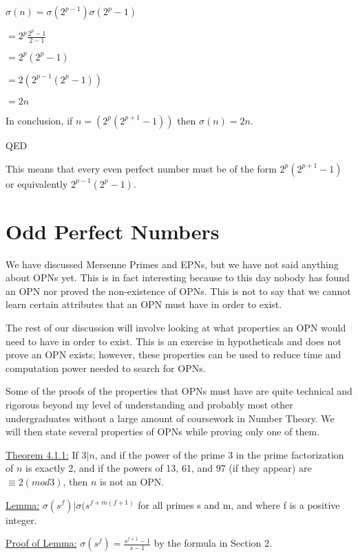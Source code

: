 \documentclass[12pt]{amsart}
\begin{document}
\begin{center}
$\sigma(n) = \sigma(2^{p-1}) \sigma(2^p -1)$

$ = 2^p\frac{2^p - 1}{2-1}$

$ = 2^p(2^p - 1)$

$ = 2(2^{p-1}(2^p - 1))$

$ = 2n$

\end{center}

In conclusion, if $n = (2^p(2^{p+1}-1))$ then $\sigma(n) = 2n$. 

QED

This means that every even perfect number must be of the form $2^p(2^{p+1}-1)$ or equivalently $2^{p-1}(2^p -1)$.

\newpage

\section{Odd Perfect Numbers}

We have discussed Mersenne Primes and EPNs, but we have not said anything about OPNs yet. This is in fact interesting because to this day nobody has found an OPN nor proved the non-existence of OPNs. This is not to say that we cannot learn certain attributes that an OPN must have in order to exist.

The rest of our discussion will involve looking at what properties an OPN would need to have in order to exist. This is an exercise in hypotheticals and does not prove an OPN exists; however, these properties can be used to reduce time and computation power needed to search for OPNs.

Some of the proofs of the properties that OPNs must have are quite technical and rigorous beyond my level of understanding and probably most other undergraduates without a large amount of coursework in Number Theory. We will then state several properties of OPNs while proving only one of them.

\underline{Theorem 4.1.1:} If $3|n$, and if the power of the prime 3 in the prime factorization of $n$ is exactly 2, and if the powers of 13, 61, and 97 (if they appear) are $\equiv 2 (mod 3)$, then $n$ is not an OPN.

\underline{Lemma:} $\sigma(s^f)|\sigma(s^{f+m(f+1)}$ for all primes s and m, and where f is a positive integer.

\underline{Proof of Lemma:} $\sigma(s^f) = \frac{s^{f+1}-1}{s-1}$ by the formula in Section 2.
\end{document}
